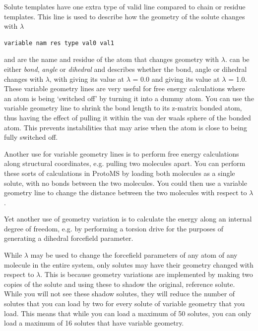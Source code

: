 \documentclass[letterpaper,10pt,english]{sphinxmanual}
\begin{document}
Solute templates have one extra type of valid line compared to chain or residue templates. This line is used to describe how the geometry of the solute changes with \(\lambda\)

\begin{Verbatim}[commandchars=\\\{\}]
variable nam res type val0 val1
\end{Verbatim}

 and  are the name and residue of the atom that changes geometry with \(\lambda\).  can be either \emph{bond}, \emph{angle} or \emph{dihedral} and describes whether the bond, angle or dihedral changes with \(\lambda\), with  giving its value at \(\lambda\) = 0.0 and  giving its value at \(\lambda\) = 1.0. These variable geometry lines are very useful for free energy calculations where an atom is being ‘switched off’ by turning it into a dummy atom. You can use the variable geometry line to shrink the bond length to its z-matrix bonded atom, thus having the effect of pulling it within the van der waals sphere of the bonded atom. This prevents instabilities that may arise when the atom is close to being fully switched off.

Another use for variable geometry lines is to perform free energy calculations along structural coordinates, e.g. pulling two molecules apart. You can perform these sorts of calculations in ProtoMS by loading both molecules as a single solute, with no bonds between the two molecules. You could then use a variable geometry line to change the distance between the two molecules with respect to \(\lambda\).

Yet another use of geometry variation is to calculate the energy along an internal degree of freedom, e.g. by performing a torsion drive for the purposes of generating a dihedral forcefield parameter.

While \(\lambda\) may be used to change the forcefield parameters of any atom of any molecule in the entire system, only solutes may have their geometry changed with respect to \(\lambda\). This is because geometry variations are implemented by making two copies of the solute and using these to shadow the original, reference solute. While you will not see these shadow solutes, they will reduce the number of solutes that you can load by two for every solute of variable geometry that you load. This means that while you can load a maximum of 50 solutes, you can only load a maximum of 16 solutes that have variable geometry.
\end{document}
